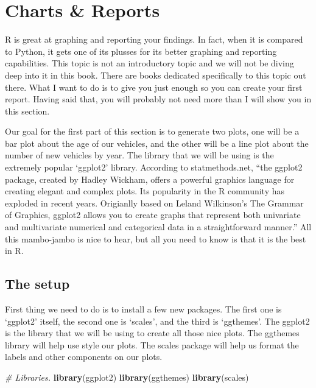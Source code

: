 \documentclass[]{book}
\newenvironment{Shaded}{\begin{snugshade}}{\end{snugshade}}
\newcommand{\CommentTok}[1]{\textcolor[rgb]{0.56,0.35,0.01}{\textit{#1}}}
\newcommand{\KeywordTok}[1]{\textcolor[rgb]{0.13,0.29,0.53}{\textbf{#1}}}
\newcommand{\NormalTok}[1]{#1}
\begin{document}
\hypertarget{charts-reports}{%
\section{Charts \& Reports}\label{charts-reports}}

R is great at graphing and reporting your findings. In fact, when it is compared to Python, it gets one of its plusses for its better graphing and reporting capabilities. This topic is not an introductory topic and we will not be diving deep into it in this book. There are books dedicated specifically to this topic out there. What I want to do is to give you just enough so you can create your first report. Having said that, you will probably not need more than I will show you in this section.

Our goal for the first part of this section is to generate two plots, one will be a bar plot about the age of our vehicles, and the other will be a line plot about the number of new vehicles by year. The library that we will be using is the extremely popular `ggplot2' library. According to statmethods.net, ``the ggplot2 package, created by Hadley Wickham, offers a powerful graphics language for creating elegant and complex plots. Its popularity in the R community has exploded in recent years. Origianlly based on Leland Wilkinson's The Grammar of Graphics, ggplot2 allows you to create graphs that represent both univariate and multivariate numerical and categorical data in a straightforward manner.'' All this mambo-jambo is nice to hear, but all you need to know is that it is the best in R.

\hypertarget{the-setup}{%
\subsection{The setup}\label{the-setup}}

First thing we need to do is to install a few new packages. The first one is `ggplot2' itself, the second one is `scales', and the third is `ggthemes'. The ggplot2 is the library that we will be using to create all those nice plots. The ggthemes library will help use style our plots. The scales package will help us format the labels and other components on our plots.

\begin{Shaded}
\begin{Highlighting}[]
\CommentTok{# Libraries.}
\KeywordTok{library}\NormalTok{(ggplot2)}
\KeywordTok{library}\NormalTok{(ggthemes)}
\KeywordTok{library}\NormalTok{(scales)}
\end{Highlighting}
\end{Shaded}
\end{document}
